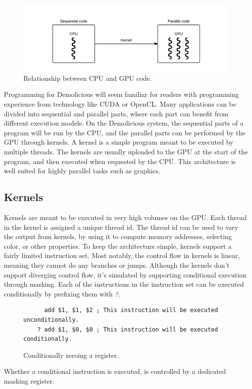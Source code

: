 \begin{figure}[H]
	\centering
	\includegraphics[width=\textwidth]{system_overview/diagrams/programming_model_cpu_gpu.png}
	\caption{Relationship between CPU and GPU code.}
	\label{fig:programming_model_cpu_gpu}
\end{figure}
Programming for Demolicious will seem familiar for readers with programming experience from technology like CUDA or OpenCL. 
Many applications can be divided into sequential and parallel parts, where each part can benefit from different execution models. 
On the Demolicious system, the sequential parts of a program will be run by the CPU, and the parallel parts can be performed by the GPU through kernels.
A kernel is a simple program meant to be executed by multiple threads.
The kernels are usually uploaded to the GPU at the start of the program, and then executed when requested by the CPU.
This architecture is well suited for highly parallel tasks such as graphics.

\subsection{Kernels}
Kernels are meant to be executed in very high volumes on the GPU.
Each thread in the kernel is assigned a unique thread id.
The thread id can be used to vary the output from kernels, 
by using it to compute memory addresses, selecting color, or other properties.
To keep the architecture simple, kernels support a fairly limited instruction set.
Most notably, the control flow in kernels is linear, meaning they cannot do any branches or jumps.
Although the kernels don't support diverging control flow,
it's simulated by supporting conditional execution through masking.
Each of the instructions in the instruction set can be executed conditionally by prefixing them with \textit{?}.

\begin{figure}[H]
	\centering
	\begin{verbatim}
	  add $1, $1, $2 ; This instruction will be executed unconditionally.
	? add $1, $0, $0 ; This instruction will be executed conditionally.
	\end{verbatim}
	\caption{Conditionally zeroing a register.}
	\label{fig:conditional_execution}
\end{figure}
Whether a conditional instruction is executed, is controlled by a dedicated masking register. 


